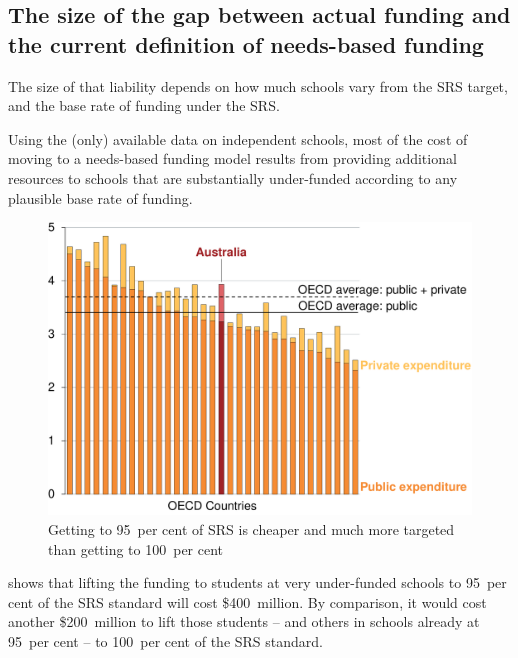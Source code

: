 \documentclass{grattan}
\begin{document}
\subsection{The size of the gap between actual funding and the current definition of needs-based funding }\label{subsec:siz-of-the-gap-between-actual-funding-and-the-current-definition}

The size of that liability depends on how much schools vary from the SRS target, and the base rate of funding under the SRS.

Using the (only) available data on independent schools, most of the cost of moving to a needs-based funding model results from providing additional resources to schools that are substantially under-funded according to any plausible base rate of funding.

\begin{figure}[p]
\caption{Getting to 95~per cent of SRS is cheaper and much more targeted than getting to 100~per cent\label{fig:getting-to-95pc-cheaper-more-targeted-than-100pc}}

\includegraphics[page=5]{atlas/Charts.pdf}

\end{figure}

 shows that lifting the funding to students at very under-funded schools to 95~per cent of the SRS standard will cost \$400~million.
By comparison, it would cost another \$200~million to lift those students -- and others in schools already at 95~per cent -- to 100~per cent of the SRS standard.
\end{document}
